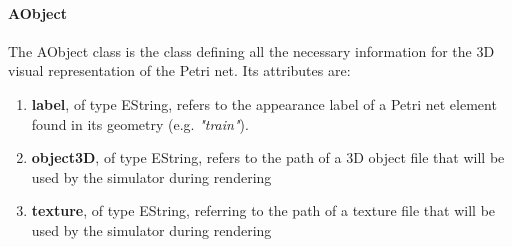 \paragraph{AObject}
The AObject class is the class defining all the necessary information for the 3D visual representation of the Petri net. Its attributes are:
\begin{enumerate}
\item  \textbf{label}, of type EString, refers to the appearance label of a Petri net element found in its geometry  (e.g. \textit{"train"}).
\item \textbf{object3D}, of type EString, refers to the path of a 3D object file that will be used by the simulator during rendering 
\item \textbf{texture}, of type EString, referring to the path of a texture file that will be used by the simulator during rendering 
\end{enumerate}


